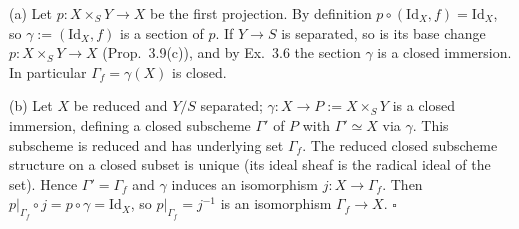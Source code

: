 \documentclass[11pt]{article}
\begin{document}
\pf
(a) Let $p:X\times_SY\to X$ be the first projection. By definition $p\circ(\mathrm{Id}_X,f)=\mathrm{Id}_X$, so $\gamma:=(\mathrm{Id}_X,f)$ is a section of $p$. If $Y\to S$ is separated, so is its base change $p:X\times_SY\to X$ (Prop.~3.9(c)), and by Ex.~3.6 the section $\gamma$ is a closed immersion. In particular $\Gamma_f=\gamma(X)$ is closed.

(b) Let $X$ be reduced and $Y/S$ separated; $\gamma:X\to P:=X\times_SY$ is a closed immersion, defining a closed subscheme $\Gamma'$ of $P$ with $\Gamma'\simeq X$ via $\gamma$. This subscheme is reduced and has underlying set $\Gamma_f$. The reduced closed subscheme structure on a closed subset is unique (its ideal sheaf is the radical ideal of the set). Hence $\Gamma'=\Gamma_f$ and $\gamma$ induces an isomorphism $j:X\to\Gamma_f$. Then $p|_{\Gamma_f}\circ j=p\circ\gamma=\mathrm{Id}_X$, so $p|_{\Gamma_f}=j^{-1}$ is an isomorphism $\Gamma_f\to X$. \hfill$\square$
\end{document}
